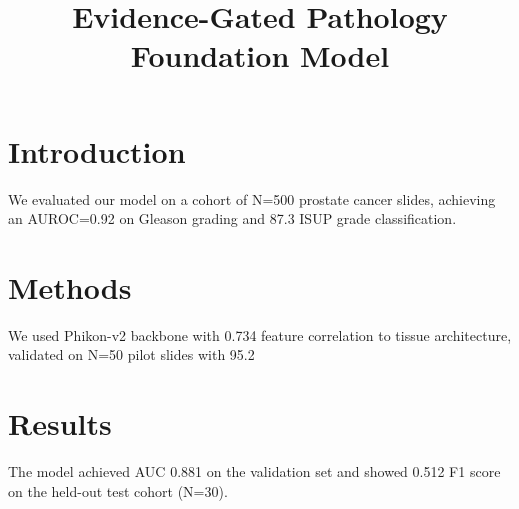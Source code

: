 \documentclass{article}
\title{Evidence-Gated Pathology Foundation Model}
\begin{document}
\section{Introduction}

We evaluated our model on a cohort of N=500 prostate cancer slides,
achieving an AUROC=0.92 on Gleason grading and 87.3%
ISUP grade classification.

\section{Methods}

We used Phikon-v2 backbone with 0.734 feature correlation to tissue
architecture, validated on N=50 pilot slides with 95.2%

\section{Results}

The model achieved AUC 0.881 on the validation set and showed
0.512 F1 score on the held-out test cohort (N=30).
\end{document}
